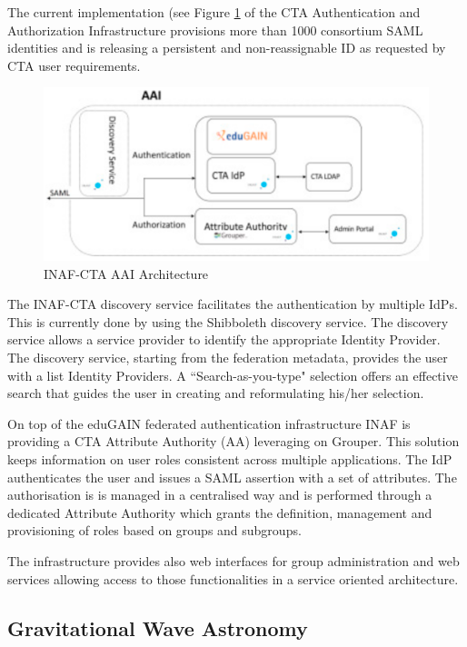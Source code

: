 \documentclass[fleqn,10pt]{wlscirep}
\begin{document}
{The current implementation\cite{costa-jgc}  (see Figure \ref{fig:ctaaai} of the CTA Authentication and Authorization Infrastructure provisions more than 1000  consortium SAML identities and is releasing a persistent and non-reassignable ID as requested by CTA user requirements. 

\begin{figure}[ht!]
  \centering
  \includegraphics[width=0.7\columnwidth]{cta-aai.png}
  \caption{INAF-CTA AAI Architecture}
  \label{fig:ctaaai}
\end{figure}

The INAF-CTA discovery service facilitates the authentication by multiple IdPs. This is currently done by using the Shibboleth discovery service. The discovery service allows a service provider to identify the appropriate Identity Provider. The discovery service, starting from the federation metadata, provides the user with a list Identity Providers. A ``Search-as-you-type" selection offers an effective search that guides the user in creating and reformulating his/her selection.

On top of the eduGAIN federated authentication infrastructure INAF is providing a CTA Attribute Authority (AA) leveraging on Grouper\cite{COSTA2018}. This solution keeps information on user roles consistent across multiple applications. The IdP authenticates the user and issues a SAML assertion with a set of attributes. The authorisation is  is managed in a centralised way and is performed through a dedicated Attribute Authority which grants the definition, management and provisioning of roles based on groups and subgroups.

The infrastructure provides also web interfaces for group administration and web services allowing access to those functionalities in a service oriented architecture. 

\subsection{Gravitational Wave Astronomy}

}
\end{document}
